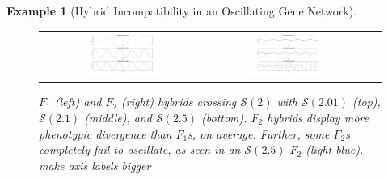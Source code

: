 \documentclass{article}
\newcommand{\plr}[1]{\todo[color=blue!25]{#1}}
\newcommand{\plri}[1]{{\color{blue}\it #1}}
\newcommand{\plr}[1]{{\color{blue}\it #1}}
\newcommand{\plri}[1]{\plr{#1}}
\newcommand{\1}{\mathbbm{1}}
\newcommand{\Sys}{\mathcal{S}}
\newtheorem{example}{Example}
\begin{document}
\begin{example}[Hybrid Incompatibility in an Oscillating Gene Network]


    \begin{figure}[H] \label{fig:hybs}
  \centering
  \begin{tabular}{ccc}
    \includegraphics[width=0.5\textwidth, height=0.25\paperheight]{F1_comparison} &
    \includegraphics[width=0.5\textwidth, height=0.25\paperheight]{F2s_comparison2}
  \end{tabular}
  \caption{
    $F_1$ (left) and $F_2$ (right) hybrids crossing $\Sys(2)$ with $\Sys(2.01)$ (top), $\Sys(2.1)$ (middle), and $\Sys(2.5)$ (bottom).
    $F_2$ hybrids display more phenotypic divergence than $F_1$s, on average. Further, some $F_2$s completely fail to oscillate, as seen in an $\Sys(2.5)$ $F_2$ (light blue).
    \plri{make axis labels bigger}
  }
\end{figure}


\end{example}
\end{document}
